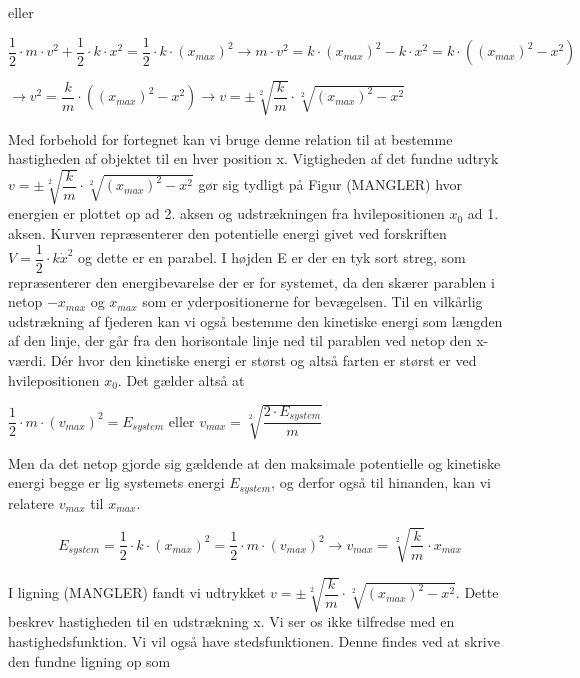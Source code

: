 \documentclass[12pt,a4paper]{article}
\theoremstyle{break}
\theoremstyle{nonumberplain}
\begin{document}
eller 

\bigskip
\begin{center}
$\dfrac{1}{2} \cdot m \cdot v^2 + \dfrac{1}{2} \cdot k \cdot x^2 = \dfrac{1}{2} \cdot k \cdot (x_{max})^2 \rightarrow m \cdot v^2 = k \cdot (x_{max})^2 - k \cdot x^2 = k \cdot ((x_{max})^2 - x^2)$

$\rightarrow v^2 = \dfrac{k}{m} \cdot ((x_{max})^2 - x^2) \rightarrow v = \pm \sqrt[2]{\dfrac{k}{m}} \cdot \sqrt[2]{(x_{max})^2-x^2}$
\end{center}
\bigskip

Med forbehold for fortegnet kan vi bruge denne relation til at bestemme hastigheden af objektet til en hver position x. Vigtigheden af det fundne udtryk $v = \pm \sqrt[2]{\dfrac{k}{m}} \cdot \sqrt[2]{(x_{max})^2-x^2}$ gør sig tydligt på Figur (MANGLER) hvor energien er plottet op ad 2. aksen og udstrækningen fra hvilepositionen $x_0$ ad 1. aksen. Kurven repræsenterer den potentielle energi givet ved forskriften $V=\dfrac{1}{2} \cdot k \dot x^2$ og dette er en parabel. I højden E er der en tyk sort streg, som repræsenterer den energibevarelse der er for systemet, da den skærer parablen i netop $-x_{max}$ og $x_{max}$ som er yderpositionerne for bevægelsen. Til en vilkårlig udstrækning af fjederen kan vi også bestemme den kinetiske energi som længden af den linje, der går fra den horisontale linje ned til parablen ved netop den x-værdi. Dér hvor den kinetiske energi er størst og altså farten er størst er ved hvilepositionen $x_0$. Det gælder altså at

\bigskip
\begin{center}
$\dfrac{1}{2} \cdot m \cdot (v_{max})^2 = E_{system}$ eller $v_{max} = \sqrt[2]{\dfrac{2 \cdot E_{system}}{m}}$
\end{center}
\bigskip

Men da det netop gjorde sig gældende at den maksimale potentielle og kinetiske energi begge er lig systemets energi $E_{system}$, og derfor også til hinanden, kan vi relatere $v_{max}$ til $x_{max}$.

\begin{center}
\begin{equation}
E_{system} = \dfrac{1}{2} \cdot k \cdot (x_{max})^2 = \dfrac{1}{2} \cdot m \cdot (v_{max})^2 \rightarrow v_{max} = \sqrt[2]{\dfrac{k}{m}} \cdot x_{max}
\end{equation}
\end{center}

I ligning (MANGLER) fandt vi udtrykket $v = \pm \sqrt[2]{\dfrac{k}{m}} \cdot \sqrt[2]{(x_{max})^2-x^2}$. Dette beskrev hastigheden til en udstrækning x. Vi ser os ikke tilfredse med en hastighedsfunktion. Vi vil også have stedsfunktionen. Denne findes ved at skrive den fundne ligning op som 
\end{document}
